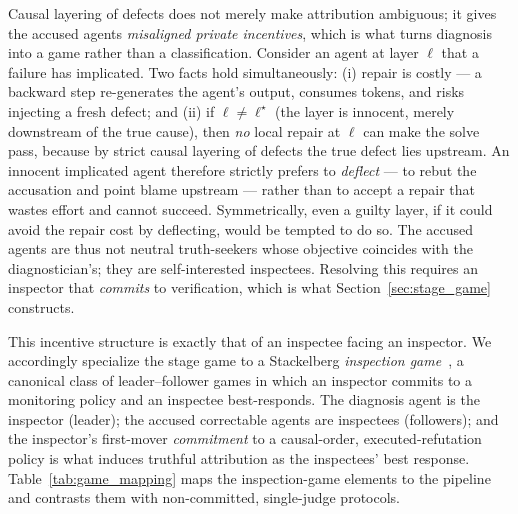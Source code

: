 \documentclass[a4paper,fleqn]{cas-sc}
\begin{document}
Causal layering of defects does not merely make attribution ambiguous; it
gives the accused agents \emph{misaligned private incentives}, which is what
turns diagnosis into a game rather than a classification. Consider an agent
at layer $\ell$ that a failure has implicated. Two facts hold simultaneously:
(i) repair is costly --- a backward step re-generates the agent's output,
consumes tokens, and risks injecting a fresh defect; and (ii) if
$\ell\neq\ell^{\star}$ (the layer is innocent, merely downstream of the true
cause), then \emph{no} local repair at $\ell$ can make the solve pass,
because by strict causal layering of defects the true defect lies upstream.
An innocent implicated agent therefore strictly prefers to \emph{deflect}
--- to rebut the accusation and point blame upstream --- rather than to
accept a repair that wastes effort and cannot succeed. Symmetrically, even a
guilty layer, if it could avoid the repair cost by deflecting, would be
tempted to do so. The accused agents are thus not neutral truth-seekers whose
objective coincides with the diagnostician's; they are self-interested
inspectees. Resolving this requires an inspector that \emph{commits} to
verification, which is what Section~\ref{sec:stage_game} constructs.

This incentive structure is exactly that of an inspectee facing an inspector.
We accordingly specialize the stage game to a Stackelberg
\emph{inspection game}~\citep{avenhaus2002inspection,maschler1966inspection},
a canonical class of leader--follower games in which an inspector commits to a
monitoring policy and an inspectee best-responds. The diagnosis agent is the
inspector (leader); the accused correctable agents are inspectees (followers);
and the inspector's first-mover \emph{commitment} to a causal-order,
executed-refutation policy is what induces truthful attribution as the
inspectees' best response. Table~\ref{tab:game_mapping} maps the
inspection-game elements to the pipeline and contrasts them with
non-committed, single-judge protocols.
\end{document}
